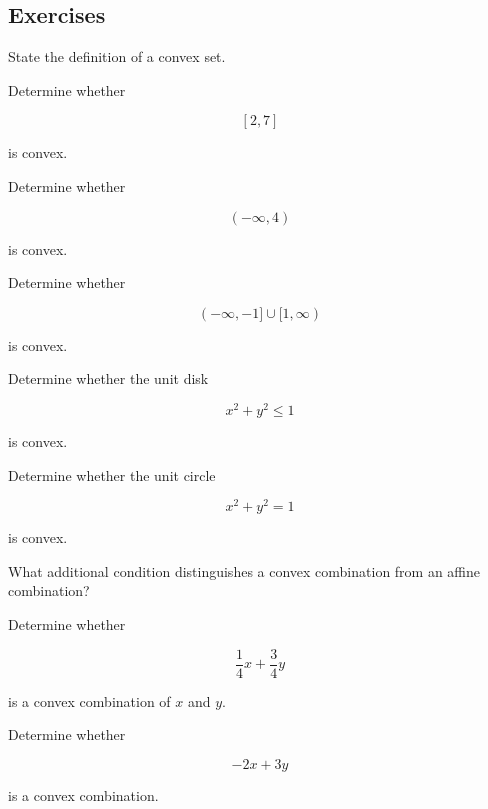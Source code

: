 \subsection{Exercises}
\label{subsec:convex-geometry-exercises}

\begin{exercise}[1]
State the definition of a convex set.
\end{exercise}

\begin{exercise}[1]
Determine whether

\[
[2,7]
\]

is convex.
\end{exercise}

\begin{exercise}[1]
Determine whether

\[
(-\infty,4)
\]

is convex.
\end{exercise}

\begin{exercise}[1]
Determine whether

\[
(-\infty,-1]\cup[1,\infty)
\]

is convex.
\end{exercise}

\begin{exercise}[1]
Determine whether the unit disk

\[
x^2+y^2\leq1
\]

is convex.
\end{exercise}

\begin{exercise}[1]
Determine whether the unit circle

\[
x^2+y^2=1
\]

is convex.
\end{exercise}

\begin{exercise}[1]
What additional condition distinguishes a convex combination from an affine
combination?
\end{exercise}

\begin{exercise}[1]
Determine whether

\[
\frac14x+\frac34y
\]

is a convex combination of \(x\) and \(y\).
\end{exercise}

\begin{exercise}[1]
Determine whether

\[
-2x+3y
\]

is a convex combination.
\end{exercise}

